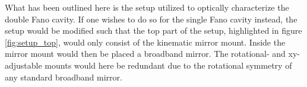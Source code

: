 What has been outlined here is the setup utilized to optically characterize the double Fano cavity. If one wishes to do so for the single Fano cavity instead, the setup would be modified such that the top part of the setup, highlighted in figure \ref{fig:setup_top}, would only consist of the kinematic mirror mount. Inside the mirror mount would then be placed a broadband mirror. The rotational- and xy-adjustable mounts would here be redundant due to the rotational symmetry of any standard broadband mirror.
